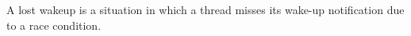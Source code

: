 A lost wakeup is a situation in which a thread misses its wake-up notification due to a race condition.
